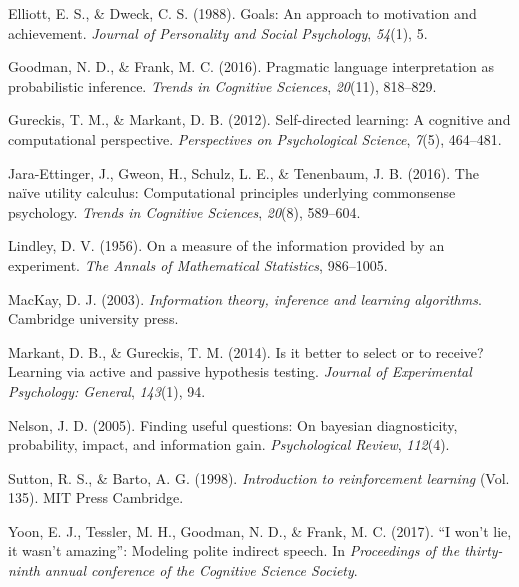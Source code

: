 \documentclass[10pt, letterpaper]{article}
\begin{document}
\hypertarget{ref-elliott1988}{}
Elliott, E. S., \& Dweck, C. S. (1988). Goals: An approach to motivation
and achievement. \emph{Journal of Personality and Social Psychology},
\emph{54}(1), 5.

\hypertarget{ref-goodman2016}{}
Goodman, N. D., \& Frank, M. C. (2016). Pragmatic language
interpretation as probabilistic inference. \emph{Trends in Cognitive
Sciences}, \emph{20}(11), 818--829.

\hypertarget{ref-gureckis2012}{}
Gureckis, T. M., \& Markant, D. B. (2012). Self-directed learning: A
cognitive and computational perspective. \emph{Perspectives on
Psychological Science}, \emph{7}(5), 464--481.

\hypertarget{ref-jara2016}{}
Jara-Ettinger, J., Gweon, H., Schulz, L. E., \& Tenenbaum, J. B. (2016).
The naïve utility calculus: Computational principles underlying
commonsense psychology. \emph{Trends in Cognitive Sciences},
\emph{20}(8), 589--604.

\hypertarget{ref-lindley1956}{}
Lindley, D. V. (1956). On a measure of the information provided by an
experiment. \emph{The Annals of Mathematical Statistics}, 986--1005.

\hypertarget{ref-mackay2003}{}
MacKay, D. J. (2003). \emph{Information theory, inference and learning
algorithms}. Cambridge university press.

\hypertarget{ref-markant2014}{}
Markant, D. B., \& Gureckis, T. M. (2014). Is it better to select or to
receive? Learning via active and passive hypothesis testing.
\emph{Journal of Experimental Psychology: General}, \emph{143}(1), 94.

\hypertarget{ref-nelson2005}{}
Nelson, J. D. (2005). Finding useful questions: On bayesian
diagnosticity, probability, impact, and information gain.
\emph{Psychological Review}, \emph{112}(4).

\hypertarget{ref-sutton1998}{}
Sutton, R. S., \& Barto, A. G. (1998). \emph{Introduction to
reinforcement learning} (Vol. 135). MIT Press Cambridge.

\hypertarget{ref-yoon2017}{}
Yoon, E. J., Tessler, M. H., Goodman, N. D., \& Frank, M. C. (2017). ``I
won't lie, it wasn't amazing'': Modeling polite indirect speech. In
\emph{Proceedings of the thirty-ninth annual conference of the Cognitive
Science Society}.
\end{document}

